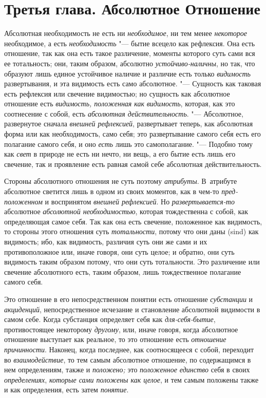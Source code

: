 \chapter[{\em Третья глава} Абсолютное Отношение]{Третья глава. Абсолютное Отношение}

Абсолютная необходимость не есть ни {\em необходимое}, ни тем менее
{\em некоторое} необходимое, а есть
{\em необходимость} "--- бытие всецело как рефлексия. Она
есть отношение, так как она есть такое различение, моменты которого суть
сами вся ее тотальность; они, таким образом, абсолютно
{\em устойчиво-наличны}, но так, что образуют лишь
единое устойчивое наличие и различие есть только
{\em видимость} развертывания, и эта видимость есть
само абсолютное. "--- Сущность как таковая есть рефлексия или свечение
видимостью; но сущность как абсолютное отношение есть
{\em видимость, положенная как
}{\em видимость}, которая, как это соотнесение с собой,
есть {\em абсолютная действительность}. "--- Абсолютное,
развернутое сначала {\em внешней рефлексией},
развертывает теперь, как абсолютная форма или как необходимость, само себя;
это развертывание самого себя есть его полагание самого себя, и оно
{\em есть} лишь это самополагание. "--- Подобно тому как
{\em свет} в природе не есть ни нечто, ни вещь, а его
бытие есть лишь его свечение, так и проявление есть равная самой себе
абсолютная действительность.

Стороны абсолютного отношения не суть поэтому {\em атрибуты}. В~атрибуте
абсолютное светится лишь в одном из своих моментов, как в чем-то
{\em пред-положенном} и воспринятом {\em внешней рефлексией}.
Но {\em развертывается-то} абсолютное {\em абсолютной необходимостью}, которая
тождественна с собой, как определяющая самое себя. Так как она есть свечение,
положенное как видимость, то стороны этого отношения суть {\em тотальности},
потому что они даны (sind) как видимость; ибо, как видимость, различия суть они
же сами и их противоположное или, иначе говоря, они суть целое; и обратно, они
суть видимость таким образом потому, что они суть тотальности. Это различение
или свечение абсолютного есть, таким образом, лишь тождественное полагание
самого себя.

Это отношение в его непосредственном понятии есть отношение
{\em субстанции} и {\em акциденций}, непосредственное исчезание и
становление абсолютной видимости в самом себе. Когда субстанция определяет
себя как {\em для-себя-бытие}, противостоящее
некоторому {\em другому}, или, иначе говоря, когда
абсолютное отношение выступает как реальное, то это отношение есть
{\em отношение причинности}. Наконец, когда последнее,
как соотносящееся с собой, переходит во
{\em взаимодействие}, то тем самым абсолютное
отношение, по содержащимся в нем определениям, также и
{\em положено;} это {\em положенное
единство} себя в своих {\em определениях},
{\em которые сами положены как целое}, и тем самым
положены также и как определения, есть затем {\em понятие}.

